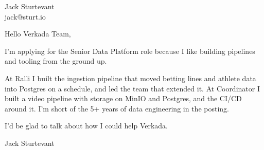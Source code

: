 \documentclass[11pt]{article}
\begin{document}
\raggedright

{\namefont\fontsize{20pt}{24pt}\selectfont Jack Sturtevant}\\[-0.3em]
jack@sturt.io

\vspace{1.2em}

Hello Verkada Team,

I'm applying for the Senior Data Platform role because I like building pipelines and tooling from the ground up.

At Ralli I built the ingestion pipeline that moved betting lines and athlete data into Postgres on a schedule, and led the team that extended it. At Coordinator I built a video pipeline with storage on MinIO and Postgres, and the CI/CD around it. I'm short of the 5+ years of data engineering in the posting.

I'd be glad to talk about how I could help Verkada.

\vspace{0.6em}
Jack Sturtevant
\end{document}
